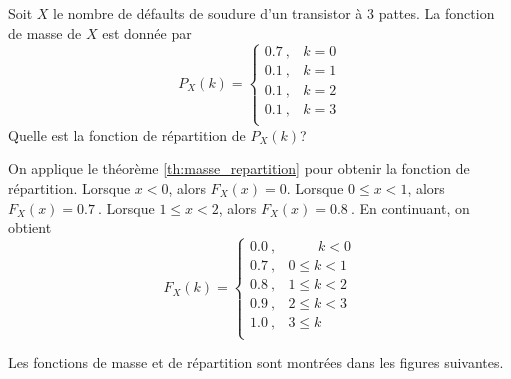 \documentclass[11pt]{article}
\begin{document}
\pagebreak
\begin{exemple}
	Soit $X$ le nombre de défaults de soudure d'un transistor à 3 pattes. La
	fonction de masse de $X$ est donnée par
	\begin{equation*}
		P_X(k)=\left\{
			\begin{matrix}
				\SI{0.7}{}, & k=0\\
				\SI{0.1}{}, & k=1\\
				\SI{0.1}{}, & k=2\\
				\SI{0.1}{}, & k=3\\
			\end{matrix}
		\right.
	\end{equation*}
	Quelle est la fonction de répartition de $P_X(k)$?

	On applique le théorème \ref{th:masse_repartition} pour obtenir la
	fonction de répartition. Lorsque $x<0$, alors $F_X(x)=0$. Lorsque
	$0\leq x<1$, alors $F_X(x)=\SI{0.7}{}$. Lorsque $1\leq x<2$, alors
	$F_X(x)=\SI{0.8}{}$. En continuant, on obtient
	\begin{equation*}
		F_X(k)=\left\{
			\begin{matrix}
				\SI{0.0}{}, & \phantom{0\;\leq}k<0\\
				\SI{0.7}{}, & 0\leq k<1\\
				\SI{0.8}{}, & 1\leq k<2\\
				\SI{0.9}{}, & 2\leq k<3\\
				\SI{1.0}{}, & 3\leq k\phantom{<0\;}\\
			\end{matrix}
		\right.
	\end{equation*}

	Les fonctions de masse et de répartition sont montrées dans les figures
	suivantes.

	\noindent
	\begin{minipage}{0.5\textwidth}
		\begin{figure}[H]
			\centering
			
		\end{figure}
	\end{minipage}%
	\begin{minipage}{0.5\textwidth}
		\begin{figure}[H]
			\centering
			
		\end{figure}
	\end{minipage}
\end{exemple}
\end{document}
